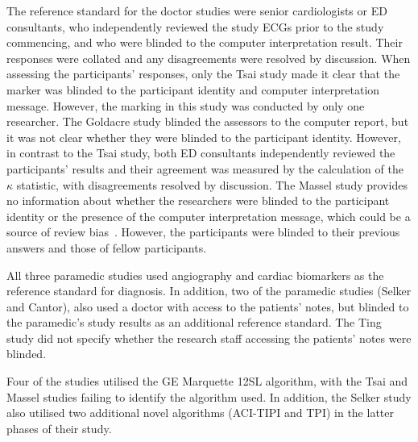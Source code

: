 The reference standard for the doctor studies were senior cardiologists or ED consultants, who independently reviewed the study ECGs prior to the study commencing, and who were blinded to the computer interpretation result. Their responses were collated and any disagreements were resolved by discussion. When assessing the participants' responses, only the Tsai study made it clear that the marker was blinded to the participant identity and computer interpretation message. However, the marking in this study was conducted by only one researcher. The Goldacre study blinded the assessors to the computer report, but it was not clear whether they were blinded to the participant identity. However, in contrast to the Tsai study, both ED consultants independently reviewed the participants' results and their agreement was measured by the calculation of the $  \kappa  $ statistic, with disagreements resolved by discussion. The Massel study provides no information about whether the researchers were blinded to the participant identity or the presence of the computer interpretation message, which could be a source of review bias~\citep{whiting_sources_2004}. However, the participants were blinded to their previous answers and those of fellow participants. 

All three paramedic studies used angiography and cardiac biomarkers as the reference standard for diagnosis. In addition, two of the paramedic studies (Selker and Cantor), also used a doctor with access to the patients' notes, but blinded to the paramedic's study results as an additional reference standard. The Ting study did not specify whether the research staff accessing the patients' notes were blinded.

Four of the studies utilised the GE Marquette 12SL algorithm, with the Tsai and Massel studies failing to identify the algorithm used. In addition, the Selker study also utilised two additional novel algorithms (ACI-TIPI and TPI) in the latter phases of their study.

